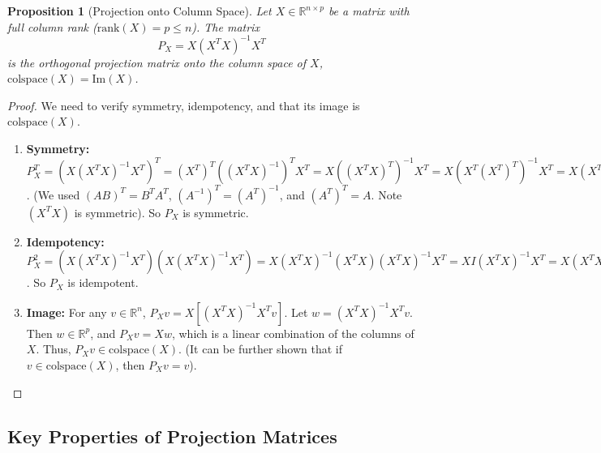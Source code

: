 \documentclass[11pt, a4paper]{article}
\theoremstyle{mydefinitionstyle}
\theoremstyle{mytheoremstyle}
\newtheorem{proposition}{Proposition}[section]
\newcommand{\R}{\mathbb{R}}
\newcommand{\colspace}{\text{colspace}}
\newcommand{\im}{\text{Im}} %
\newcommand{\rank}{\text{rank}}
\begin{document}
\begin{proposition}[Projection onto Column Space] \label{prop:proj_colspace}
    Let $X \in \R^{n \times p}$ be a matrix with full column rank ($\rank(X) = p \le n$). The matrix
    \[ P_X = X(X^T X)^{-1} X^T \]
    is the orthogonal projection matrix onto the column space of $X$, $\colspace(X) = \im(X)$.
\end{proposition}
\begin{proof}
    We need to verify symmetry, idempotency, and that its image is $\colspace(X)$.
    \begin{enumerate}
        \item \textbf{Symmetry:} $P_X^T = (X(X^T X)^{-1} X^T)^T = (X^T)^T ((X^T X)^{-1})^T X^T = X ((X^T X)^T)^{-1} X^T = X (X^T (X^T)^T)^{-1} X^T = X (X^T X)^{-1} X^T = P_X$. (We used $(AB)^T = B^T A^T$, $(A^{-1})^T = (A^T)^{-1}$, and $(A^T)^T=A$. Note $(X^TX)$ is symmetric). So $P_X$ is symmetric.
        \item \textbf{Idempotency:} $P_X^2 = (X(X^T X)^{-1} X^T) (X(X^T X)^{-1} X^T) = X(X^T X)^{-1} (X^T X) (X^T X)^{-1} X^T = X I (X^T X)^{-1} X^T = X(X^T X)^{-1} X^T = P_X$. So $P_X$ is idempotent.
        \item \textbf{Image:} For any $v \in \R^n$, $P_X v = X [(X^T X)^{-1} X^T v]$. Let $w = (X^T X)^{-1} X^T v$. Then $w \in \R^p$, and $P_X v = Xw$, which is a linear combination of the columns of $X$. Thus, $P_X v \in \colspace(X)$. (It can be further shown that if $v \in \colspace(X)$, then $P_X v = v$).
    \end{enumerate}
\end{proof}

\subsection{Key Properties of Projection Matrices}
\end{document}
